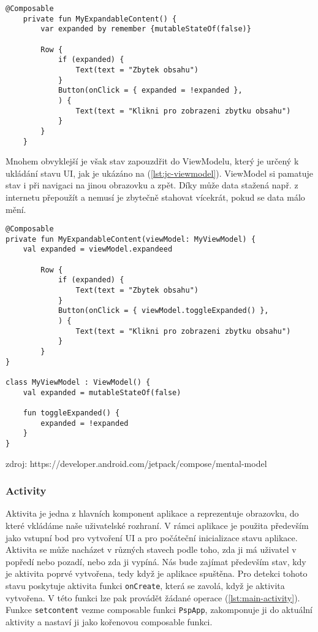 \begin{lstlisting}[caption={Příklad composable funkce používající lokální stav.}, label={lst:jc-state}, tabsize=2]
	@Composable
	private fun MyExpandableContent() {
		var expanded by remember {mutableStateOf(false)}
		
		Row {
			if (expanded) {
				Text(text = "Zbytek obsahu")
			}
			Button(onClick = { expanded = !expanded },
			) {
				Text(text = "Klikni pro zobrazeni zbytku obsahu")
			}
		}
	}
\end{lstlisting}

\noindent Mnohem obvyklejší je však stav zapouzdřit do ViewModelu, který je určený k ukládání stavu UI, jak je ukázáno na (\ref{lst:jc-viewmodel}). ViewModel si pamatuje stav i při navigaci na jinou obrazovku a zpět. Díky může data stažená např. z internetu přepoužít a nemusí je zbytečně stahovat vícekrát, pokud se data málo mění.

\begin{lstlisting}[caption={Příklad composable funkce používající stav z ViewModelu.}, label={lst:jc-viewmodel}, tabsize=2]
@Composable
private fun MyExpandableContent(viewModel: MyViewModel) {
    val expanded = viewModel.expandeed

		Row {
			if (expanded) {
				Text(text = "Zbytek obsahu")
			}
			Button(onClick = { viewModel.toggleExpanded() },
			) {
				Text(text = "Klikni pro zobrazeni zbytku obsahu")
			}
		}
}

class MyViewModel : ViewModel() {
	val expanded = mutableStateOf(false)
	
	fun toggleExpanded() {
		expanded = !expanded
	}
}
\end{lstlisting}

\noindent zdroj:
https://developer.android.com/jetpack/compose/mental-model

\subsubsection*{Activity}
Aktivita je jedna z hlavních komponent aplikace a reprezentuje obrazovku, do které vkládáme naše uživatelské rozhraní. V rámci aplikace je použita především jako vstupní bod pro vytvoření UI a pro počáteční inicializace stavu aplikace. Aktivita se může nacházet v různých stavech podle toho, zda ji má uživatel v popředí nebo pozadí, nebo zda ji vypíná. Nás bude zajímat především stav, kdy je aktivita poprvé vytvořena, tedy když je aplikace spuštěna. Pro detekci tohoto stavu poskytuje aktivita funkci \lstinline|onCreate|, která se zavolá, když je aktivita vytvořena. V této funkci lze pak provádět žádané operace (\ref{lst:main-activity}). Funkce \lstinline|setcontent| vezme composable funkci \lstinline|PspApp|, zakomponuje ji do aktuální aktivity a nastaví ji jako kořenovou composable funkci.


